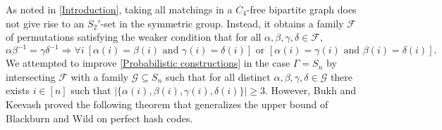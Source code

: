 \documentclass[12pt]{article}
\begin{document}

As noted in \autoref{Introduction}, taking all matchings in a $C_4$-free bipartite graph does not give rise to an $S_2'$-set in the symmetric group. Instead, it obtains a family $\mathcal F$ of permutations satisfying the weaker condition that for all $\alpha,\beta,\gamma,\delta\in\mathcal F$, 
    \begin{equation} \label{sidon implication}
    \alpha\beta^{-1}=\gamma\delta^{-1}\Longrightarrow\forall i\ [\alpha(i)=\beta(i)\text{ and }\gamma(i)=\delta(i)]\text{ or }[\alpha(i)=\gamma(i)\text{ and }\beta(i)=\delta(i)].
    \end{equation}
We attempted to improve \autoref{Probabilistic constructions} in the case $\Gamma=S_n$ by intersecting $\mathcal F$ with a family $\mathcal G\subseteq S_n$ such that for all distinct $\alpha,\beta,\gamma,\delta\in\mathcal G$ there exists $i\in[n]$ such that $|\{\alpha(i),\beta(i),\gamma(i),\delta(i)\}|\ge 3$. However, Bukh and Keevash \cite{Bukh2025generalization} proved the following theorem that generalizes the upper bound of Blackburn and Wild \cite{blackburn1998optimal} on perfect hash codes.

\end{document}
